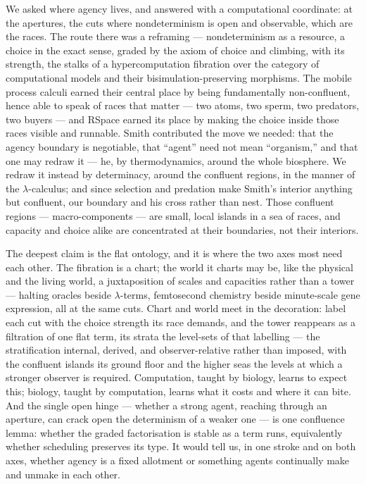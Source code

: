 \documentclass[11pt]{article}
\theoremstyle{definition}
\theoremstyle{plain}
\theoremstyle{remark}
\begin{document}
We asked where agency lives, and answered with a computational coordinate: at the apertures,
the cuts where nondeterminism is open and observable, which are the races. The route there
was a reframing --- nondeterminism as a resource, a choice in the exact sense, graded by the
axiom of choice and climbing, with its strength, the stalks of a hypercomputation fibration
over the category of computational models and their bisimulation-preserving morphisms. The
mobile process calculi earned their central place by being fundamentally non-confluent, hence
able to speak of races that matter --- two atoms, two sperm, two predators, two buyers --- and
RSpace earned its place by making the choice inside those races visible and runnable. Smith
contributed the move we needed: that the agency boundary is negotiable, that ``agent'' need not
mean ``organism,'' and that one may redraw it --- he, by thermodynamics, around the whole
biosphere. We redraw it instead by determinacy, around the confluent regions, in the manner of
the $\lambda$-calculus; and since selection and predation make Smith's interior anything but
confluent, our boundary and his cross rather than nest. Those confluent regions ---
macro-components --- are small, local islands in a sea of races, and capacity and choice alike
are concentrated at their boundaries, not their interiors.

The deepest claim is the flat ontology, and it is where the two axes most need each other. The
fibration is a chart; the world it charts may be, like the physical and the living world, a
juxtaposition of scales and capacities rather than a tower --- halting oracles beside
$\lambda$-terms, femtosecond chemistry beside minute-scale gene expression, all at the same
cuts. Chart and world meet in the decoration: label each cut with the choice strength its race
demands, and the tower reappears as a filtration of one flat term, its strata the level-sets of
that labelling --- the stratification internal, derived, and observer-relative rather than imposed,
with the confluent islands its ground floor and the higher seas the levels at which a stronger
observer is required. Computation, taught by biology, learns to expect this; biology, taught by
computation, learns what it costs and where it can bite. And the single open hinge --- whether a
strong agent, reaching through an aperture, can crack open the determinism of a weaker one --- is
one confluence lemma: whether the graded factorisation is stable as a term runs, equivalently
whether scheduling preserves its type. It would tell us, in one stroke and on both axes, whether
agency is a fixed allotment or something agents continually make and unmake in each other.
\end{document}
